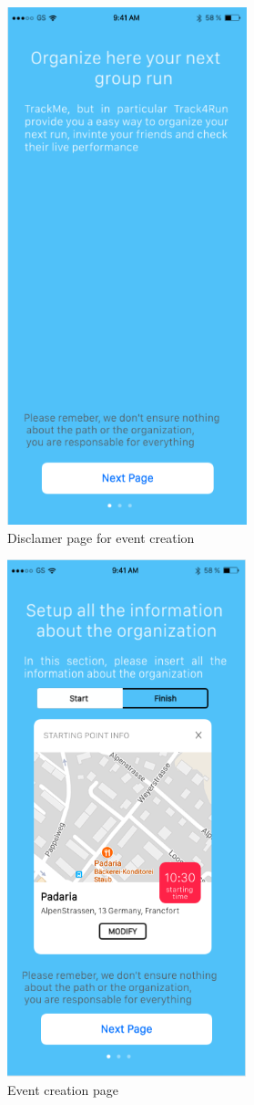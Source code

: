 \documentclass{article}
\begin{document}
	\begin{figure}[!h]
	 	\centering
		\includegraphics[height=15cm,keepaspectratio]{Figures/Screen02}
		\caption{Disclamer page for event creation}
	\end{figure}\newpage
	
	\begin{figure}[!h]
	 	\centering
		\includegraphics[height=15cm,keepaspectratio]{Figures/Screen01}
		\caption{Event creation page}
	\end{figure}\newpage
	
\end{document}
